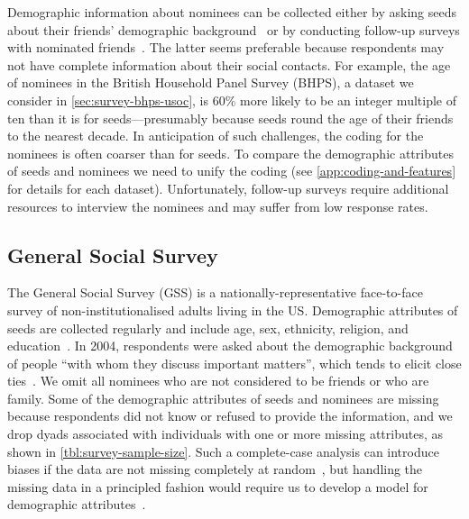 \documentclass{scrartcl}
\begin{document}
Demographic information about nominees can be collected either by asking seeds about their friends' demographic background~\cite{Marsden1987,McPherson2006} or by conducting follow-up surveys with nominated friends~\cite{Johnson1989}. The latter seems preferable because respondents may not have complete information about their social contacts. For example, the age of nominees in the British Household Panel Survey (BHPS), a dataset we consider in \cref{sec:survey-bhps-usoc}, is 60\% more likely to be an integer multiple of ten than it is for seeds---presumably because seeds round the age of their friends to the nearest decade. In anticipation of such challenges, the coding for the nominees is often coarser than for seeds. To compare the demographic attributes of seeds and nominees we need to unify the coding (see \cref{app:coding-and-features} for details for each dataset). Unfortunately, follow-up surveys require additional resources to interview the nominees and may suffer from low response rates.

\subsection{General Social Survey\label{sec:survey-gss}}

The General Social Survey (GSS) is a nationally-representative face-to-face survey of non-institutionalised adults living in the US. Demographic attributes of seeds are collected regularly and include age, sex, ethnicity, religion, and education~\cite{Marsden1987,Marsden1988}. In 2004, respondents were asked about the demographic background of people ``with whom they discuss important matters'', which tends to elicit close ties~\cite{Marin2004}. We omit all nominees who are not considered to be friends or who are family. Some of the demographic attributes of seeds and nominees are missing because respondents did not know or refused to provide the information, and we drop dyads associated with individuals with one or more missing attributes, as shown in \cref{tbl:survey-sample-size}. Such a complete-case analysis can introduce biases if the data are not missing completely at random~\cite{Rubin1976}, but handling the missing data in a principled fashion would require us to develop a model for demographic attributes~\cite{Pigott2001, Gelman2013}.
\end{document}

